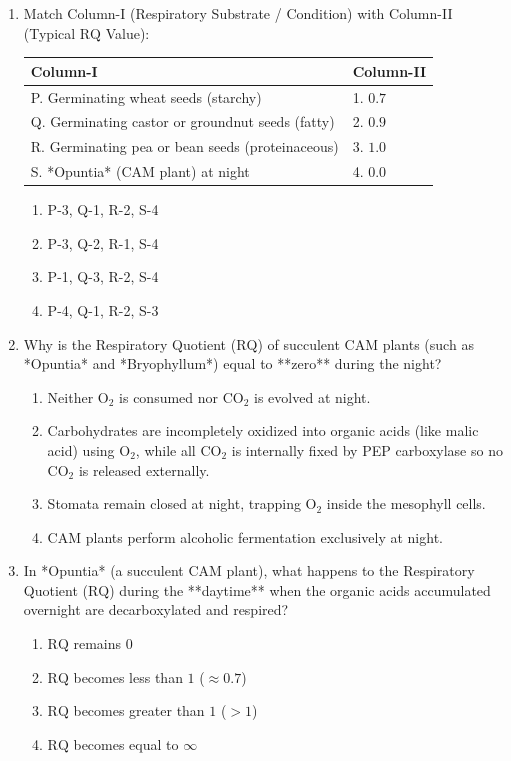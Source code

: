 \documentclass[11pt, a4paper]{article}
\begin{document}
\begin{enumerate}[label=\textbf{\arabic*.}]
\item Match Column-I (Respiratory Substrate / Condition) with Column-II (Typical $\text{RQ}$ Value):
\begin{center}
\begin{tabular}{|l|l|}
\hline
\textbf{Column-I} & \textbf{Column-II} \\
\hline
P. Germinating wheat seeds (starchy) & 1. $0.7$ \\
Q. Germinating castor or groundnut seeds (fatty) & 2. $0.9$ \\
R. Germinating pea or bean seeds (proteinaceous) & 3. $1.0$ \\
S. *Opuntia* (CAM plant) at night & 4. $0.0$ \\
\hline
\end{tabular}
\end{center}
\begin{enumerate}[label=(\Alph*)]
    \item P-3, Q-1, R-2, S-4
    \item P-3, Q-2, R-1, S-4
    \item P-1, Q-3, R-2, S-4
    \item P-4, Q-1, R-2, S-3
\end{enumerate}

\item Why is the Respiratory Quotient ($\text{RQ}$) of succulent CAM plants (such as *Opuntia* and *Bryophyllum*) equal to **zero** during the night?
\begin{enumerate}[label=(\Alph*)]
    \item Neither $\text{O}_2$ is consumed nor $\text{CO}_2$ is evolved at night.
    \item Carbohydrates are incompletely oxidized into organic acids (like malic acid) using $\text{O}_2$, while all $\text{CO}_2$ is internally fixed by PEP carboxylase so no $\text{CO}_2$ is released externally.
    \item Stomata remain closed at night, trapping $\text{O}_2$ inside the mesophyll cells.
    \item CAM plants perform alcoholic fermentation exclusively at night.
\end{enumerate}

\item In *Opuntia* (a succulent CAM plant), what happens to the Respiratory Quotient ($\text{RQ}$) during the **daytime** when the organic acids accumulated overnight are decarboxylated and respired?
\begin{enumerate}[label=(\Alph*)]
    \item $\text{RQ}$ remains $0$
    \item $\text{RQ}$ becomes less than $1$ ($\approx 0.7$)
    \item $\text{RQ}$ becomes greater than $1$ ($> 1$)
    \item $\text{RQ}$ becomes equal to $\infty$
\end{enumerate}


\end{enumerate}
\end{document}
